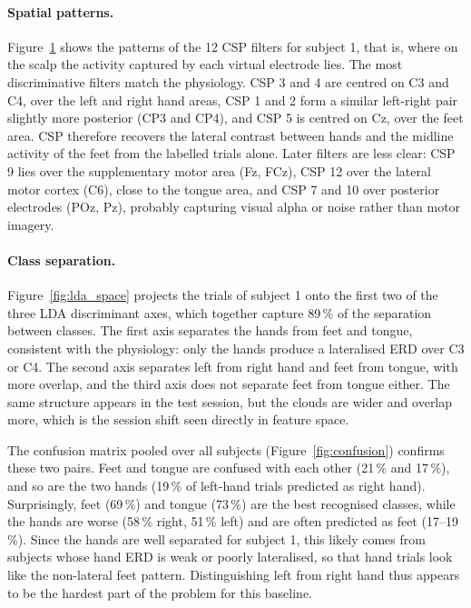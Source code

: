 \paragraph{Spatial patterns.}
Figure~\ref{fig:csp_patterns} shows the patterns of the 12 CSP filters for subject 1, that is, where on the scalp the activity captured by each virtual electrode lies. The most discriminative filters match the physiology. CSP 3 and 4 are centred on C3 and C4, over the left and right hand areas, CSP 1 and 2 form a similar left-right pair slightly more posterior (CP3 and CP4), and CSP 5 is centred on Cz, over the feet area. CSP therefore recovers the lateral contrast between hands and the midline activity of the feet from the labelled trials alone. Later filters are less clear: CSP 9 lies over the supplementary motor area (Fz, FCz), CSP 12 over the lateral motor cortex (C6), close to the tongue area, and CSP 7 and 10 over posterior electrodes (POz, Pz), probably capturing visual alpha or noise rather than motor imagery.

\begin{figure}[t]
  \centering
  \caption{}
  \label{fig:csp_patterns}
\end{figure}

\paragraph{Class separation.}
Figure~\ref{fig:lda_space} projects the trials of subject 1 onto the first two of the three LDA discriminant axes, which together capture 89\,\% of the separation between classes. The first axis separates the hands from feet and tongue, consistent with the physiology: only the hands produce a lateralised ERD over C3 or C4. The second axis separates left from right hand and feet from tongue, with more overlap, and the third axis does not separate feet from tongue either. The same structure appears in the test session, but the clouds are wider and overlap more, which is the session shift seen directly in feature space.

The confusion matrix pooled over all subjects (Figure~\ref{fig:confusion}) confirms these two pairs. Feet and tongue are confused with each other (21\,\% and 17\,\%), and so are the two hands (19\,\% of left-hand trials predicted as right hand). Surprisingly, feet (69\,\%) and tongue (73\,\%) are the best recognised classes, while the hands are worse (58\,\% right, 51\,\% left) and are often predicted as feet (17--19\,\%). Since the hands are well separated for subject 1, this likely comes from subjects whose hand ERD is weak or poorly lateralised, so that hand trials look like the non-lateral feet pattern. Distinguishing left from right hand thus appears to be the hardest part of the problem for this baseline.

